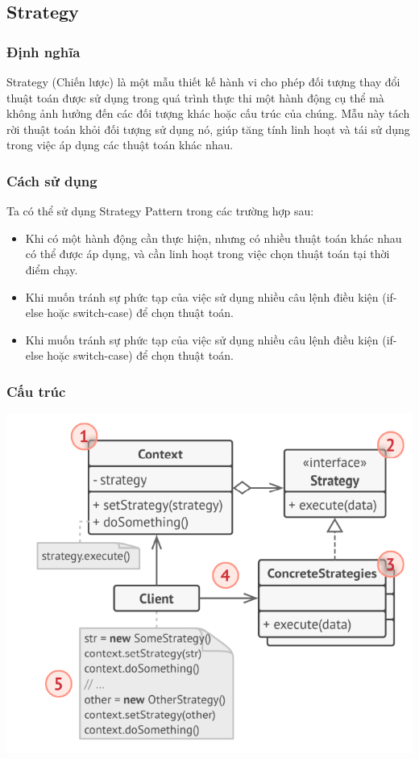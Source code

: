 \subsection{Strategy}
\subsubsection{Định nghĩa}
Strategy (Chiến lược) là một mẫu thiết kế hành vi cho phép đối tượng thay đổi thuật toán được sử dụng trong quá trình thực thi một hành động cụ thể mà không ảnh hưởng đến các đối tượng khác hoặc cấu trúc của chúng. Mẫu này tách rời thuật toán khỏi đối tượng sử dụng nó, giúp tăng tính linh hoạt và tái sử dụng trong việc áp dụng các thuật toán khác nhau.
\subsubsection{Cách sử dụng}
Ta có thể sử dụng Strategy Pattern trong các trường hợp sau:
\begin{itemize}
    \item Khi có một hành động cần thực hiện, nhưng có nhiều thuật toán khác nhau có thể được áp dụng, và cần linh hoạt trong việc chọn thuật toán tại thời điểm chạy.
    \item Khi muốn tránh sự phức tạp của việc sử dụng nhiều câu lệnh điều kiện (if-else hoặc switch-case) để chọn thuật toán.
    \item Khi muốn tránh sự phức tạp của việc sử dụng nhiều câu lệnh điều kiện (if-else hoặc switch-case) để chọn thuật toán.
\end{itemize}
\subsubsection{Cấu trúc}
\begin{center}
    \includegraphics[scale=0.6]{image/behavioral/strategy.png}
\end{center}
